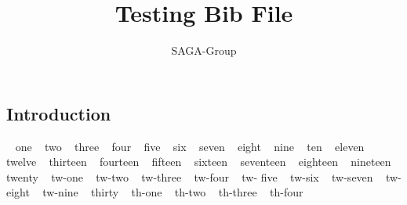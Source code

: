 \documentclass[a4paper,10pt]{article}
\newcommand{\jhanote}[1]{  {\textcolor{red}     { ***Shantenu: #1 }}}
\newcommand{\jhanote}[1]{}
\begin{document}
 \title{ \Large \vspace{-3.5em} Testing Bib File }
 
 \author{ SAGA-Group
 }
 \date{}
 \maketitle
 




\subsection*{Introduction}


~\cite {sagastuff} one
~\cite {saga-req} two
~\cite {Kaiser:2006qp} three
~\cite {saga-uc} four
  ~\cite {1267323} five
  ~\cite {ogf-gfd-71} six
   ~\cite {saga_gin} seven
    ~\cite {escience07} eight
    ~\cite {ogf-gfd-90} nine
     ~\cite {saga_condor} ten
      ~\cite {Luckow:2008la} eleven
       ~\cite {saga_gfd90} twelve
       ~\cite{saga_url} thirteen
       ~\cite {ogf-gwd-r-96} fourteen
       ~\cite {saga_tg08} fifteen
       ~\cite {10.1109/GPC.2009.17} sixteen
	~\cite {saga_data_intensive_abstractions} seventeen
	~\cite {sagamontage09} eighteen
	~\cite {dpagrid2009} nineteen
	~\cite {1542058} twenty
	~\cite {co2_escience2009} tw-one
	~\cite {repex_ptrsa} tw-two
	~\cite{gmac09} tw-three
	~\cite{luckow2009adaptive} tw-four
	~\cite {saga_bigjob_condor_cloud} tw- five
	~\cite {saga_mapreduce} tw-six
	~\cite {saga_condor_url} tw-seven
	~\cite {remd-manager_url} tw-eight
	~\cite {gridrpc_url} tw-nine
	~\cite {jsaga} thirty
	~\cite {glite} th-one
	~\cite {ogf_web} th-two
	~\cite {saga_core_long} th-three
	~\cite {saga-tools} th-four
	

 
  
 
\end{document}
